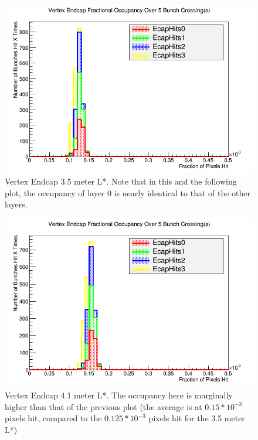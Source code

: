 \documentclass{report}
\begin{document}
                \begin{figure}[H]
                    \centering
                    \includegraphics[height=.4\textheight]{Voccupancy_sidloi3_IR_realign_preqd0shift_5B_ps30_1510212229_ecp}
                    \caption{Vertex Endcap 3.5 meter L*. Note that in this and the following plot, the occupancy of layer 0 is nearly identical to that of the other layers.}
                    \label{fig__lstar_vertex_ecp_3.5}
                \end{figure}
                \begin{figure}[H]
                    \includegraphics[height=.4\textheight]{Voccupancy_sidloi3_IR_realign_5B_ps30_1510211229_ecp}
                    \centering
                    \caption{Vertex Endcap 4.1 meter L*. The occupancy here is marginally higher than that of the previous plot (the average is at $0.15*10^{-3}$ pixels hit, compared to the $0.125*10^{-3}$ pixels hit for the 3.5 meter L*)}
                    \label{fig__lstar_vertex_ecp_4.1}
                \end{figure}
\end{document}
